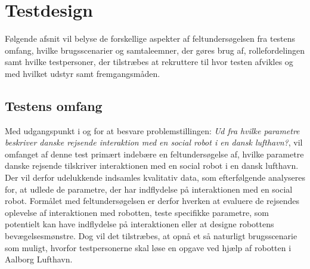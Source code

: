 \chapter{Testdesign}
\label{ParametreTestdesign}
%
Følgende afsnit vil belyse de forskellige aspekter af feltundersøgelsen fra testens omfang, hvilke brugsscenarier og samtaleemner, der gøres brug af, rollefordelingen samt hvilke testpersoner, der tilstræbes at rekruttere til hvor testen afvikles og med hvilket udstyr samt fremgangsmåden.  
%
\section{Testens omfang}
\label{ParametreTestensOmfang}
%
Med udgangspunkt i og for at besvare problemstillingen: \textit{Ud fra hvilke parametre beskriver danske rejsende interaktion med en social robot i en dansk lufthavn?}, vil omfanget af denne test primært indebære en feltundersøgelse af, hvilke parametre danske rejsende tilskriver interaktionen med en social robot i en dansk lufthavn. Der vil derfor udelukkende indsamles kvalitativ data, som efterfølgende analyseres for, at udlede de parametre, der har indflydelse på interaktionen med en social robot. Formålet med feltundersøgelsen er derfor hverken at evaluere de rejsendes oplevelse af interaktionen med robotten, teste specifikke parametre, som potentielt kan have indflydelse på interaktionen eller at designe robottens bevægelsesmønstre. Dog vil det tilstræbes, at opnå et så naturligt brugsscenarie som muligt, hvorfor testpersonerne skal løse en opgave ved hjælp af robotten i Aalborg Lufthavn. 
 
 
 



